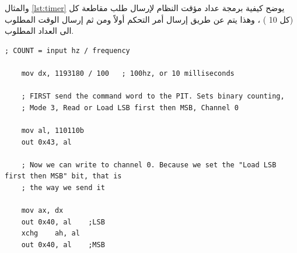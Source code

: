 \documentclass[document.tex]{subfiles}
\begin{document}
والمثال \ref{lst:timer} يوضح كيفية برمجة عداد مؤقت النظام لإرسال طلب مقاطعة كل  (كل 10 ) ، وهذا يتم عن طريق إرسال أمر التحكم أولاً ومن ثم إرسال الوقت المطلوب الى العداد المطلوب.

\begin{english}

\lstset{numberstyle=\tiny,numbers=left,stepnumber=1,numbersep=5pt,tabsize=2,extendedchars=true,breaklines=true,frame=b,showspaces=false, showtabs=false,xleftmargin=10pt,framexleftmargin=10pt,framexrightmargin=5pt,framexbottommargin=4pt,showstringspaces=false,language=[x86masm]Assembler}


\begin{lstlisting}[label=lst:timer,caption=\en{PIT programming}]
       ; COUNT = input hz / frequency
 
	mov	dx, 1193180 / 100	; 100hz, or 10 milliseconds
 
	; FIRST send the command word to the PIT. Sets binary counting,
	; Mode 3, Read or Load LSB first then MSB, Channel 0
 
	mov	al, 110110b
	out	0x43, al
 
	; Now we can write to channel 0. Because we set the "Load LSB first then MSB" bit, that is
	; the way we send it
 
	mov	ax, dx
	out	0x40, al	;LSB
	xchg	ah, al
	out	0x40, al	;MSB
\end{lstlisting}
\end{english}
\end{document}

